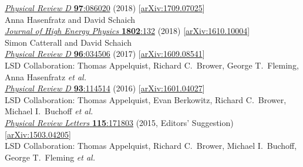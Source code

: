 \begin{spacelistout}
\begin{revnumerate}
      \href{http://dx.doi.org/10.1103/PhysRevD.97.086020}{\textit{Physical Review D} \textbf{97}:086020} (2018) [\href{http://arxiv.org/abs/1709.07025}{arXiv:1709.07025}]
    \pagebreakitem
       \\
      Anna Hasenfratz and David Schaich \\
      \href{http://dx.doi.org/10.1007/JHEP02(2018)132}{\textit{Journal of High Energy Physics} \textbf{1802}:132} (2018) [\href{http://arxiv.org/abs/1610.10004}{arXiv:1610.10004}]
    \pagebreakitem
       \\
      Simon Catterall and David Schaich \\
      \href{http://dx.doi.org/10.1103/PhysRevD.96.034506}{\textit{Physical Review D} \textbf{96}:034506} (2017) [\href{http://arxiv.org/abs/1609.08541}{arXiv:1609.08541}]
    \pagebreakitem
       \\
      LSD Collaboration: Thomas Appelquist, Richard C.~Brower, George T.~Fleming, Anna Hasenfratz \textit{et al.} \\ %
      \href{http://dx.doi.org/10.1103/PhysRevD.93.114514}{\textit{Physical Review D} \textbf{93}:114514} (2016) [\href{http://arxiv.org/abs/1601.04027}{arXiv:1601.04027}]
    \pagebreakitem
       \\
      LSD Collaboration: Thomas Appelquist, Evan Berkowitz, Richard C.~Brower, Michael I.~Buchoff \textit{et al.} \\ %
      \href{http://dx.doi.org/10.1103/PhysRevLett.115.171803}{\textit{Physical Review Letters} \textbf{115}:171803} (2015, Editors' Suggestion) [\href{http://arxiv.org/abs/1503.04205}{arXiv:1503.04205}]
    \pagebreakitem
       \\
      LSD Collaboration: Thomas Appelquist, Richard C.~Brower, Michael I.~Buchoff, George T.~Fleming \textit{et al.} \\ %

\end{revnumerate}
\end{spacelistout}
